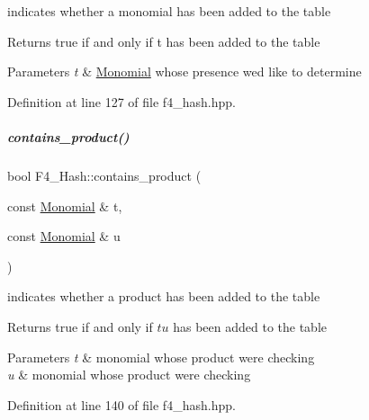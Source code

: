 indicates whether a monomial has been added to the table 

\begin{DoxyReturn}{Returns}
{\ttfamily true} if and only if {\ttfamily t} has been added to the table 
\end{DoxyReturn}

\begin{DoxyParams}{Parameters}
{\em t} & {\ttfamily \hyperlink{group__polygroup_class_monomial}{Monomial}} whose presence we\textquotesingle{}d like to determine \\
\hline
\end{DoxyParams}


Definition at line 127 of file f4\+\_\+hash.\+hpp.

\mbox{\label{group___g_b_computation_aae8b0444fbe19fff11a0a5d242295156}} 
\subparagraph{\texorpdfstring{contains\+\_\+product()}{contains\_product()}}
{\footnotesize\ttfamily bool F4\+\_\+\+Hash\+::contains\+\_\+product (\begin{DoxyParamCaption}\item[{const \hyperlink{group__polygroup_class_monomial}{Monomial} \&}]{t,  }\item[{const \hyperlink{group__polygroup_class_monomial}{Monomial} \&}]{u }\end{DoxyParamCaption})\hspace{0.3cm}{\ttfamily [inline]}}



indicates whether a product has been added to the table 

\begin{DoxyReturn}{Returns}
{\ttfamily true} if and only if $ tu $ has been added to the table 
\end{DoxyReturn}

\begin{DoxyParams}{Parameters}
{\em t} & monomial whose product we\textquotesingle{}re checking \\
\hline
{\em u} & monomial whose product we\textquotesingle{}re checking \\
\hline
\end{DoxyParams}


Definition at line 140 of file f4\+\_\+hash.\+hpp.

